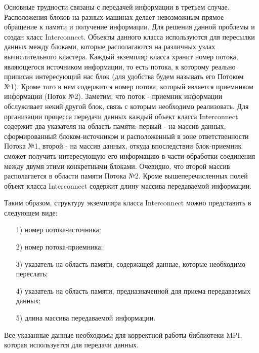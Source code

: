 \documentclass[a4paper, 14pt]{extarticle}
\theoremstyle{definition}
\begin{document}
\par Основные трудности связаны с передачей информации в третьем случае. Расположения блоков на разных машинах делает невозможным прямое обращение к памяти и получение информации. Для решения данной проблемы и создан класс Interconnect. Объекты данного класса используются для пересылки данных между блоками, которые располагаются на различных узлах вычислительного кластера. Каждый экземпляр класса хранит номер потока, являющегося источником информации, то есть потока, к которому реально приписан интересующий нас блок (для удобства будем называть его Потоком №1). Кроме того в нем содержится номер потока, который является приемником информации (Поток №2). Заметим, что поток - приемник информации обслуживает некий другой блок, связь с которым необходимо реализовать. Для организации процесса передачи данных каждый объект класса Interconnect содержит два указателя на область памяти: первый - на массив данных, сформированный блоком-источником и расположенный в зоне ответственности Потока №1, второй - на массив данных, откуда впоследствии блок-приемник сможет получить интересующую его информацию в части обработки соединения между двумя этими конкретными блоками. Очевидно, что второй массив располагается в области памяти Потока №2. Кроме вышеперечисленных полей объект класса Interconnect содержит длину массива передаваемой информации.

\par Таким образом, структуру экземпляра класса Interconnect можно представить в следующем виде:
\begin{enumerate}
\item[1)] номер потока-источника;
\item[2)] номер потока-приемника;
\item[3)] указатель на область памяти, содержащей данные, которые необходимо переслать;
\item[4)] указатель на область памяти, предназначенной для приема передаваемых данных;
\item[5)] длина массива передаваемой информации.
\end{enumerate}

\par Все указанные данные необходимы для корректной работы библиотеки MPI, которая используется для передачи данных.
\end{document}
